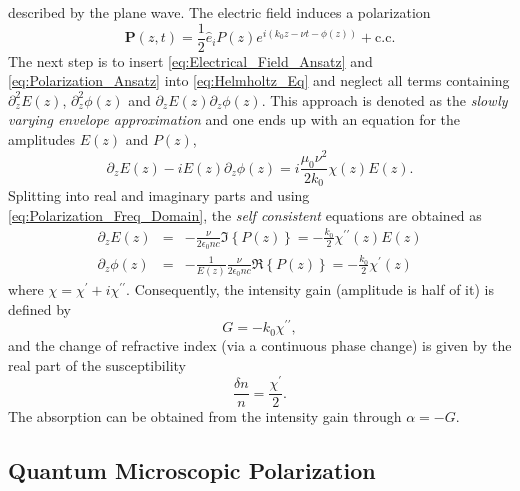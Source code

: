 described by the plane wave. The electric field induces a polarization
\begin{equation}
\mathbf{P}(z,t)=\frac{1}{2}\hat{e}_{i}P(z)e^{i\left(k_{0}z-\nu t-\phi(z)\right)}+\mbox{c.c}.\label{eq:Polarization_Ansatz}\end{equation}
The next step is to insert \ref{eq:Electrical_Field_Ansatz} and \ref{eq:Polarization_Ansatz}
into \ref{eq:Helmholtz_Eq} and neglect all terms containing $\partial_{z}^{2}E(z)$,
$\partial_{z}^{2}\phi(z)$ and $\partial_{z}E(z)\partial_{z}\phi(z)$.
This approach is denoted as the \emph{slowly varying envelope approximation}
and one ends up with an equation for the amplitudes $E(z)$ and $P(z)$,\begin{equation}
\partial_{z}E(z)-iE(z)\partial_{z}\phi(z)=i\frac{\mu_{0}\nu^{2}}{2k_{0}}\chi(z)E(z).\end{equation}
Splitting into real and imaginary parts and using \ref{eq:Polarization_Freq_Domain},
the \emph{self consistent} equations are obtained as\begin{eqnarray}
\partial_{z}E(z) & = & -\frac{\nu}{2\epsilon_{0}nc}\Im\left\{ P(z)\right\} =-\frac{k_{0}}{2}\chi^{\prime\prime}(z)E(z)\\
\partial_{z}\phi(z) & = & -\frac{1}{E(z)}\frac{\nu}{2\epsilon_{0}nc}\Re\left\{ P(z)\right\} =-\frac{k_{0}}{2}\chi^{\prime}(z)\end{eqnarray}
where $\chi=\chi^{\prime}+i\chi^{\prime\prime}$. Consequently, the
intensity gain (amplitude is half of it) is defined by\begin{equation}
G=-k_{0}\chi^{\prime\prime},\label{eq:Intensity_Gain}\end{equation}
and the change of refractive index (via a continuous phase change)
is given by the real part of the susceptibility\begin{equation}
\frac{\delta n}{n}=\frac{\chi^{\prime}}{2}.\label{eq:Refractive_Index_Change}\end{equation}
The absorption can be obtained from the intensity gain through $\alpha=-G$.


\subsection{Quantum Microscopic Polarization}

